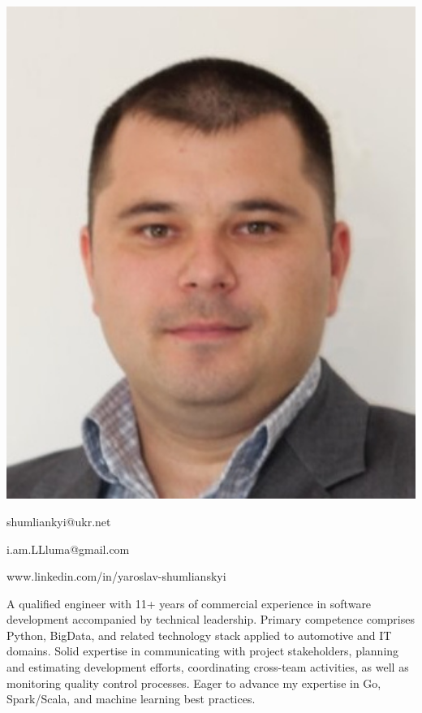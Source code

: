 \documentclass[paper=a4,fontsize=11pt]{temp} %
\begin{document}
\begin{minipage}{.2\linewidth}
   \includegraphics[width=1\textwidth]{IMG/photo}
\end{minipage}      
\begin{minipage}{0.7\linewidth}
   \sepspace
   \noindent
   
   \hfill shumliankyi@ukr.net

   \hfill i.am.LLluma@gmail.com  

   \hfill www.linkedin.com/in/yaroslav-shumlianskyi
   
 
\end{minipage}


A qualified engineer with 11+ years of commercial experience in software development accompanied by technical
leadership.
Primary competence comprises Python, BigData, and related technology stack applied to automotive and IT domains.
Solid expertise in communicating with project stakeholders, planning and estimating development efforts, coordinating
cross-team activities, as well as monitoring quality control processes.
Eager to advance my expertise in Go, Spark/Scala, and machine learning best practices.
\end{document}
